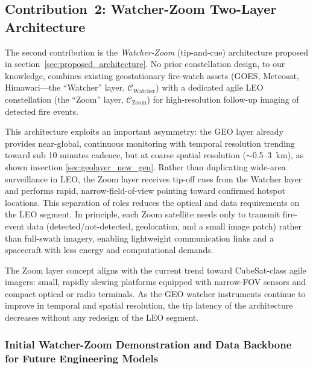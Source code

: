 \subsection{Contribution~2: Watcher-Zoom Two-Layer Architecture}

The second contribution is the \emph{Watcher-Zoom} (tip-and-cue) architecture proposed in section~\ref{sec:proposed_architecture}. No prior constellation design, to our knowledge, combines existing geostationary fire-watch assets (GOES, Meteosat, Himawari---the ``Watcher'' layer, $\mathcal{C}_{\text{Watcher}}$) with a dedicated agile LEO constellation (the ``Zoom'' layer, $\mathcal{C}_{\text{Zoom}}$) for high-resolution follow-up imaging of detected fire events.

This architecture exploits an important asymmetry: the GEO layer already provides near-global, continuous monitoring with temporal resolution trending toward sub 10 minutes cadence, but at coarse spatial resolution ($\sim$0.5--3~km), as shown insection \ref{sec:geolayer_new_gen}. Rather than duplicating wide-area surveillance in LEO, the Zoom layer receives tip-off cues from the Watcher layer and performs rapid, narrow-field-of-view pointing toward confirmed hotspot locations. This separation of roles reduces the optical and data requirements on the LEO segment. In principle, each Zoom satellite needs only to transmit fire-event data (detected/not-detected, geolocation, and a small image patch) rather than full-swath imagery, enabling lightweight communication links and a spacecraft with less energy and computational demands.

The Zoom layer concept aligns with the current trend toward CubeSat-class agile imagers: small, rapidly slewing platforms equipped with narrow-FOV sensors and compact optical or radio terminals. As the GEO watcher instruments continue to improve in temporal and spatial resolution, the tip latency of the architecture decreases without any redesign of the LEO segment.

\subsubsection{Initial Watcher-Zoom Demonstration and Data Backbone for Future Engineering Models}

